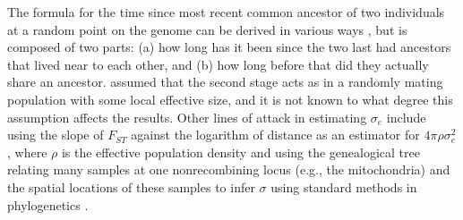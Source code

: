 \documentclass{ar-1col}
\begin{document}
The formula for
the time since most recent common ancestor 
of two individuals at a random point on the genome
can be derived in various ways 
\citep{malecot, sawyer1976branching, rousset_1997, barton-depaulis-etheridge, ringbauer2017inferring, alasadi2018estimating},
but is composed of two parts: 
(a) how long has it been since the two last had ancestors that lived near to each other,
and (b) how long before that did they actually share an ancestor.
\citet{malecot} assumed that the second stage acts as in a randomly mating population
with some local effective size,
and it is not known to what degree this assumption affects the results.
Other lines of attack in estimating $\sigma_e$ include 
using the slope of $F_{ST}$ against the logarithm of distance
as an estimator for $4 \pi \rho \sigma_e^2$,
where $\rho$ is the effective population density \citep{rousset_1997}
and 
using the genealogical tree relating many samples at one nonrecombining locus
(e.g., the mitochondria) and the spatial locations of these samples
to infer $\sigma$ using standard methods in phylogenetics \citep{neigel1991estimation,neigel1993application}.
\end{document}
